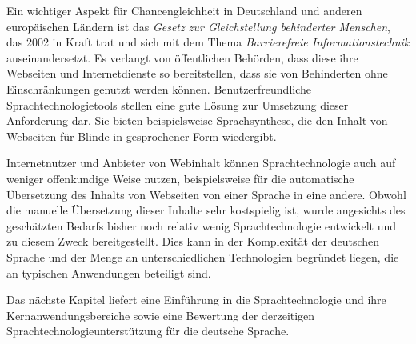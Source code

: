 \documentclass[]{../../metanetpaper}
\begin{document}
\begin{Parallel}[c]{79mm}{78mm}
{Ein wichtiger Aspekt für Chancengleichheit in Deutschland und anderen europäischen Ländern ist das \textit{Gesetz zur Gleichstellung behinderter Menschen}, das 2002 in Kraft trat und sich mit dem Thema \textit{Barrierefreie Informationstechnik} auseinandersetzt. Es verlangt von öffentlichen Behörden, dass diese ihre Webseiten und Internetdienste so bereitstellen, dass sie von Behinderten ohne Einschränkungen genutzt werden können. Benutzerfreundliche Sprachtechnologietools stellen eine gute Lösung zur Umsetzung dieser Anforderung dar. Sie bieten beispielsweise Sprachsynthese, die den Inhalt von Webseiten für Blinde in gesprochener Form wiedergibt.

Internetnutzer und Anbieter von Webinhalt können Sprachtechnologie auch auf weniger offenkundige Weise nutzen, beispielsweise für die automatische Übersetzung des Inhalts von Webseiten von einer Sprache in eine andere. Obwohl die manuelle Übersetzung dieser Inhalte sehr kostspielig ist, wurde angesichts des geschätzten Bedarfs bisher noch relativ wenig Sprachtechnologie entwickelt und zu diesem Zweck bereitgestellt. Dies kann in der Komplexität der deutschen Sprache und der Menge an unterschiedlichen Technologien begründet liegen, die an typischen Anwendungen beteiligt sind. 

Das nächste Kapitel liefert eine Einführung in die Sprachtechnologie und ihre Kernanwendungsbereiche sowie eine Bewertung der derzeitigen Sprachtechnologieunterstützung für die deutsche Sprache.
  }

\end{Parallel}
\end{document}
